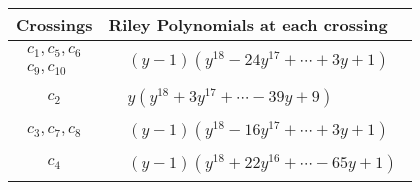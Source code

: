 \documentclass[1p]{elsarticle_modified}
\theoremstyle{definition}
\begin{document}
\begin{tabular}{m{50pt}|m{274pt}}
Crossings & \hspace{64pt}Riley Polynomials at each crossing \\
\hline $$\begin{aligned}c_{1},c_{5},c_{6}\\c_{9},c_{10}\end{aligned}$$&$\begin{aligned}
&(y-1)(y^{18}-24 y^{17}+\cdots+3 y+1)
\end{aligned}$\\
\hline $$\begin{aligned}c_{2}\end{aligned}$$&$\begin{aligned}
&y(y^{18}+3 y^{17}+\cdots-39 y+9)
\end{aligned}$\\
\hline $$\begin{aligned}c_{3},c_{7},c_{8}\end{aligned}$$&$\begin{aligned}
&(y-1)(y^{18}-16 y^{17}+\cdots+3 y+1)
\end{aligned}$\\
\hline $$\begin{aligned}c_{4}\end{aligned}$$&$\begin{aligned}
&(y-1)(y^{18}+22 y^{16}+\cdots-65 y+1)
\end{aligned}$\\
\hline
\end{tabular}
\vskip 2pc
\end{document}
